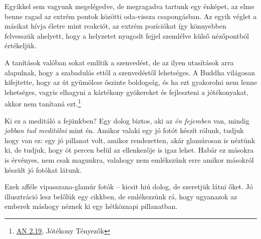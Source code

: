 Egyikkel sem vagyunk megelégedve, de megragadva tartunk egy énképet, az
elme benne ragad az extrém pontok közötti oda-vissza csapongásban. Az
egyik véglet a másikat hívja életre mint reakciót, az extrém pozíciókat
így könnyebben felvesszük ahelyett, hogy a helyzetet nyugodt fejjel
szemlélve külső nézőpontból értékeljük.

A tanítások valóban sokat említik a szenvedést, de az ilyen utasítások
arra alapulnak, hogy a szabadulás ettől a szenvedéstől lehetséges. A
Buddha világosan kifejtette, hogy az út gyümölcse őszinte boldogság, és
ha ezt gyakorolni nem lenne lehetséges, vagyis elhagyni a kártékony
gyökereket és fejleszteni a jótékonyakat, akkor nem tanítaná
ezt.\footnote{\href{https://suttacentral.net/an2.11-20/en/thanissaro}{AN
  2.19}, Jótékony Tényezők}

Ki ez a meditáló a fejünkben? Egy dolog biztos, aki az \emph{én
fejemben} van, mindig \emph{jobban tud meditálni} mint én. Amikor valaki
egy jó fotót készít rólunk, tudjuk hogy van ez: egy jó pillanat volt,
amikor rendezetten, akár glamúrosan is néztünk ki, de tudjuk, hogy öt
percen belül az ellenkezője is igaz lehet. Habár ez másokra is érvényes,
nem csak magunkra, valahogy nem emlékszünk erre amikor másokról készült
jó fotókat látunk.

Ezek afféle vipasszana-glamúr fotók -- kicsit hiú dolog, de szeretjük
látni őket. Jó illusztráció lesz belőlük egy cikkben, de emlékezzünk rá,
hogy ugyanazok az emberek máshogy néznek ki egy hétköznapi pillanatban.

\clearpage
\figurepagelayout
\null\vfill

\vspace*{-4\baselineskip}

